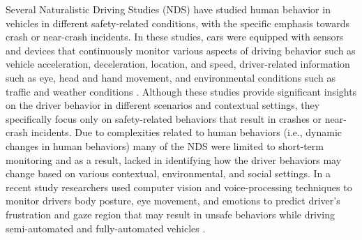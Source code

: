 Several Naturalistic Driving Studies (NDS) have studied human behavior in vehicles in different safety-related conditions, with the specific emphasis towards crash or near-crash incidents. 
In these studies, cars were equipped with sensors and devices that continuously monitor various aspects of driving behavior such as vehicle acceleration, deceleration, location, and speed, driver-related information such as eye, head and hand movement, and environmental conditions such as traffic and weather conditions \cite{eenink2014udrive, simons2015naturalistic, fridman2017autonomous, klauer2006impact, victor2015analysis, papazikou2017detecting}. 
Although these studies provide significant insights on the driver behavior in different scenarios and contextual settings, they specifically focus only on safety-related behaviors that result in crashes or near-crash incidents. 
Due to complexities related to human behaviors (i.e., dynamic changes in human behaviors) many of the NDS were limited to short-term monitoring and as a result, lacked in identifying how the driver behaviors may change based on various contextual, environmental, and social settings. 
In a recent study researchers used computer vision and voice-processing techniques to monitor drivers body posture, eye movement, and emotions to predict driver's frustration and gaze region that may result in unsafe behaviors while driving semi-automated and fully-automated vehicles \cite{fridman2017autonomous, abdic2016driver, fridman2016driver, fridman2018cognitive, fridman2016owl}. 
  

